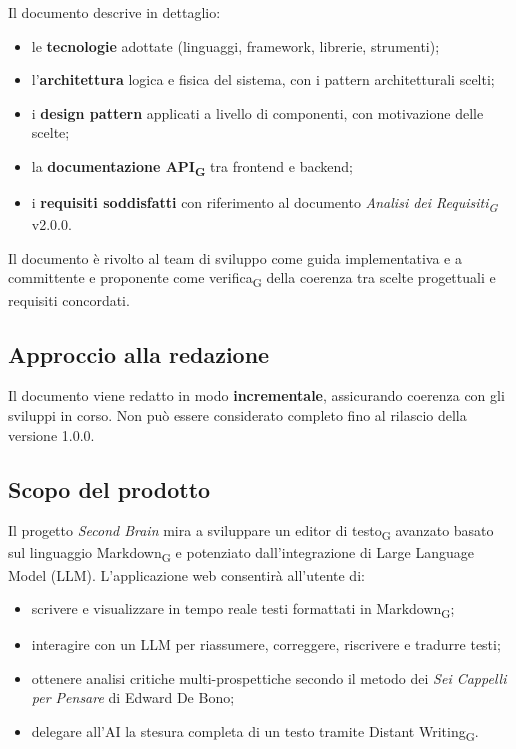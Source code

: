 \documentclass[11pt,a4paper]{article}
\newcommand{\gls}[1]{#1\textsubscript{G}}
\begin{document}
Il documento descrive in dettaglio:
\begin{itemize}
  \item le \textbf{tecnologie} adottate (linguaggi, framework, librerie, strumenti);
  \item l'\textbf{architettura} logica e fisica del sistema, con i pattern architetturali scelti;
  \item i \textbf{design pattern} applicati a livello di componenti, con motivazione delle scelte;
  \item la \textbf{documentazione \gls{API}} tra frontend e backend;
  \item i \textbf{requisiti soddisfatti} con riferimento al documento \textit{\gls{Analisi dei Requisiti}} v2.0.0.
\end{itemize}
 
Il documento è rivolto al team di sviluppo come guida implementativa e a
committente e proponente come \gls{verifica} della coerenza tra scelte progettuali e requisiti concordati.
 
\subsection{Approccio alla redazione}
Il documento viene redatto in modo \textbf{incrementale}, assicurando coerenza con gli sviluppi in corso. Non può essere considerato completo fino al rilascio della versione 1.0.0.

\subsection{Scopo del prodotto}
Il progetto \textit{Second Brain} mira a sviluppare un \gls{editor di testo} avanzato basato sul linguaggio \gls{Markdown} e potenziato dall'integrazione di Large Language Model (LLM).
L'applicazione web consentirà all'utente di:
\begin{itemize}
  \item scrivere e visualizzare in tempo reale testi formattati in \gls{Markdown};
  \item interagire con un LLM per riassumere, correggere, riscrivere e tradurre testi;
  \item ottenere analisi critiche multi-prospettiche secondo il metodo dei \textit{Sei Cappelli per Pensare} di Edward De Bono;
  \item delegare all'AI la stesura completa di un testo tramite \gls{Distant Writing}.
\end{itemize}
 
\end{document}
